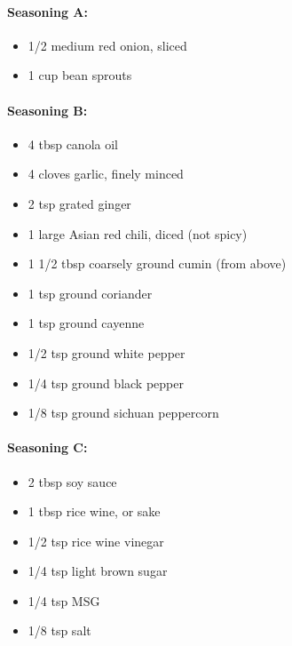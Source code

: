 \documentclass[]{article}
\providecommand{\tightlist}{%
  \setlength{\itemsep}{0pt}\setlength{\parskip}{0pt}}
\let\oldparagraph\paragraph
\renewcommand{\paragraph}[1]{\oldparagraph{#1}\mbox{}}
\begin{document}
\hypertarget{seasoning-a}{%
\paragraph{Seasoning A:}\label{seasoning-a}}

\begin{itemize}
\tightlist
\item
  1/2 medium red onion, sliced
\item
  1 cup bean sprouts
\end{itemize}

\hypertarget{seasoning-b}{%
\paragraph{Seasoning B:}\label{seasoning-b}}

\begin{itemize}
\tightlist
\item
  4 tbsp canola oil
\item
  4 cloves garlic, finely minced
\item
  2 tsp grated ginger
\item
  1 large Asian red chili, diced (not spicy)
\item
  1 1/2 tbsp coarsely ground cumin (from above)
\item
  1 tsp ground coriander
\item
  1 tsp ground cayenne
\item
  1/2 tsp ground white pepper
\item
  1/4 tsp ground black pepper
\item
  1/8 tsp ground sichuan peppercorn
\end{itemize}

\hypertarget{seasoning-c}{%
\paragraph{Seasoning C:}\label{seasoning-c}}

\begin{itemize}
\tightlist
\item
  2 tbsp soy sauce
\item
  1 tbsp rice wine, or sake
\item
  1/2 tsp rice wine vinegar
\item
  1/4 tsp light brown sugar
\item
  1/4 tsp MSG
\item
  1/8 tsp salt
\end{itemize}
\end{document}
